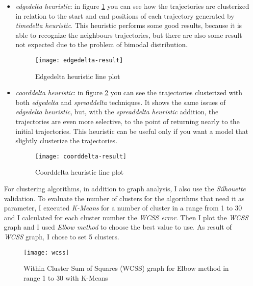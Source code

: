 \begin{itemize}
	\item \textit{edgedelta heuristic}: in figure \ref{fig:edgedelta-result} you can see how the trajectories are clusterized in relation to the start and end positions of each trajectory generated by \textit{timedelta heuristic}. This heuristic performs some good results, because it is able to recognize the neighbours trajectories, but there are also some result not expected due to the problem of bimodal distribution.  
	
	\begin{figure}[bt]
		\centering
		\texttt{[image: edgedelta-result]}
		\caption{Edgedelta heuristic line plot}
		\label{fig:edgedelta-result}
	\end{figure}
	
	\item \textit{coorddelta heuristic}: in figure \ref{fig:coorddelta-result} you can see the trajectories clusterized with both \textit{edgedelta} and \textit{spreaddelta} techniques. It shows the same issues of \textit{edgedelta heuristic}, but, with the \textit{spreaddelta heuristic} addition, the trajectories are even more selective, to the point of returning nearly to the initial trajectories. This heuristic can be useful only if you want a model that slightly clusterize the trajectories.
	
	\begin{figure}[bt]
		\centering
		\texttt{[image: coorddelta-result]}
		\caption{Coorddelta heuristic line plot}
		\label{fig:coorddelta-result}
	\end{figure}

\end{itemize}

For clustering algorithms, in addition to graph analysis, I also use the \textit{Silhouette} validation. To evaluate the number of clusters for the algorithms that need it as parameter, I executed \textit{K-Means} for a number of cluster in a range from 1 to 30 and I calculated for each cluster number the \textit{WCSS error}. Then I plot the \textit{WCSS} graph and I used \textit{Elbow method} to choose the best value to use. As result of \textit{WCSS} graph, I chose to set 5 clusters. 

\begin{figure}[bt]
	\centering
	\texttt{[image: wcss]}
	\caption{Within Cluster Sum of Squares (WCSS) graph for Elbow method in range 1 to 30 with K-Means}
	\label{fig:wcss}
\end{figure}

